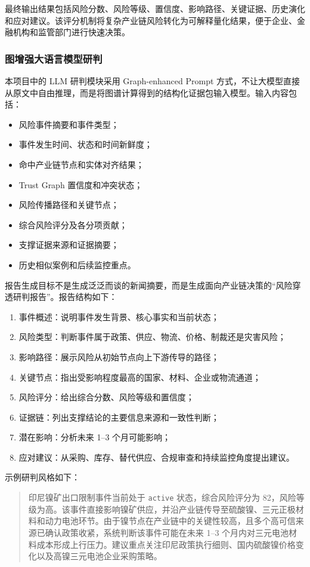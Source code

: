 \documentclass[12pt,a4paper]{article}
\begin{document}
最终输出结果包括风险分数、风险等级、置信度、影响路径、关键证据、历史演化和应对建议。该评分机制将复杂产业链风险转化为可解释量化结果，便于企业、金融机构和监管部门进行快速决策。

\subsubsection{图增强大语言模型研判}

本项目中的 LLM 研判模块采用 Graph-enhanced Prompt 方式，不让大模型直接从原文中自由推理，而是将图谱计算得到的结构化证据包输入模型。输入内容包括：
\begin{itemize}
    \item 风险事件摘要和事件类型；
    \item 事件发生时间、状态和时间新鲜度；
    \item 命中产业链节点和实体对齐结果；
    \item Trust Graph 置信度和冲突状态；
    \item 风险传播路径和关键节点；
    \item 综合风险评分及各分项贡献；
    \item 支撑证据来源和证据摘要；
    \item 历史相似案例和后续监控重点。
\end{itemize}

报告生成目标不是生成泛泛而谈的新闻摘要，而是生成面向产业链决策的“风险穿透研判报告”。报告结构如下：
\begin{enumerate}
    \item 事件概述：说明事件发生背景、核心事实和当前状态；
    \item 风险类型：判断事件属于政策、供应、物流、价格、制裁还是灾害风险；
    \item 影响路径：展示风险从初始节点向上下游传导的路径；
    \item 关键节点：指出受影响程度最高的国家、材料、企业或物流通道；
    \item 风险评分：给出综合分数、风险等级和置信度；
    \item 证据链：列出支撑结论的主要信息来源和一致性判断；
    \item 潜在影响：分析未来 1--3 个月可能影响；
    \item 应对建议：从采购、库存、替代供应、合规审查和持续监控角度提出建议。
\end{enumerate}

示例研判风格如下：
\begin{quote}
印尼镍矿出口限制事件当前处于 \texttt{active} 状态，综合风险评分为 82，风险等级为高。该事件直接影响镍矿供应，并沿产业链传导至硫酸镍、三元正极材料和动力电池环节。由于镍节点在产业链中的关键性较高，且多个高可信来源已确认政策收紧，系统判断该事件可能在未来 1--3 个月内对三元电池材料成本形成上行压力。建议重点关注印尼政策执行细则、国内硫酸镍价格变化以及高镍三元电池企业采购策略。
\end{quote}
\end{document}
